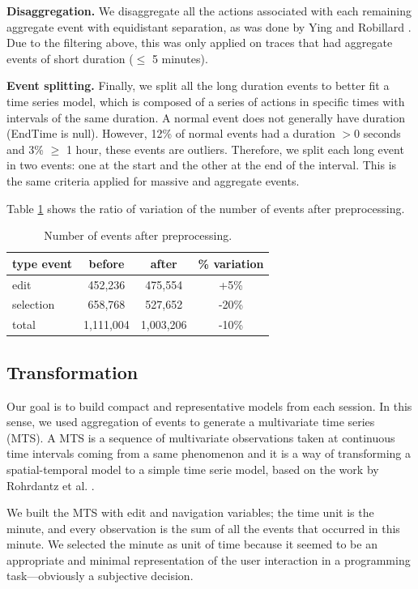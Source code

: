 \documentclass[times]{smrauth}
\begin{document}
\textbf{Disaggregation.} We disaggregate all the actions associated with each remaining aggregate event with equidistant separation, as was done by Ying and Robillard \cite{YR11}. Due to the filtering above, this was only applied on traces that had aggregate events of short duration ($\leq$ 5 minutes).

\textbf{Event splitting.} Finally, we split all the long duration events to better fit a time series model, which is composed of a series of actions in specific times with intervals of the same duration. A normal event does not generally have duration (EndTime is null). However, 12\% of normal events  had a duration $> 0$ seconds and 3\% $\geq$ 1 hour, these events are outliers. Therefore, we split each long event in two events: one at the start and the other at the end of the interval. This is the same criteria applied for massive and aggregate events.

Table \ref{tbl:mass_events} shows the ratio of variation of the number of events after preprocessing.

\begin{table}[hb!]
	\small
	\renewcommand{\arraystretch}{1.3}
	\caption{Number of events after preprocessing.}
	\label{tbl:mass_events}
	\centering
	\begin{tabular}{l | c | c | c } 
		type event & before & after & \% variation  \\  
		\hline 
		edit &	 452,236 & 475,554 &	+5\%   \\
		selection &	658,768 & 527,652 & -20\%   \\
		\hline
		total & 1,111,004 & 1,003,206 & -10\%  \\
	\end{tabular}
\end{table}

\subsection{Transformation}
Our goal is to build compact and representative models from each session. In this sense, we used aggregation of events to generate a multivariate time series (MTS). A MTS is a sequence of multivariate observations taken at continuous time intervals coming from a same phenomenon and it is a way of transforming a spatial-temporal model to a simple time serie model, based on the work by Rohrdantz et al. \cite{RHD12}.  

We built the MTS with edit and navigation variables; the time unit is the minute, and every observation is the sum of all the events that occurred in this minute. We selected the minute as unit of time because it seemed to be an appropriate and minimal representation of the user interaction in a programming task---obviously a subjective decision. 
\end{document}
